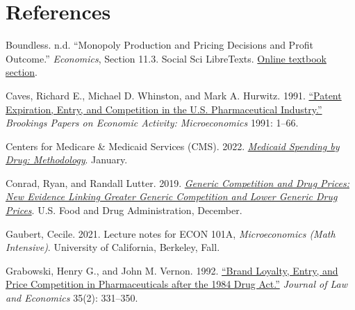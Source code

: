 \begingroup
\hypersetup{urlcolor=black}
\section*{References}
\label{sec:references}

\begin{singlespace}
\begin{list}{}{
    \setlength{\leftmargin}{1.5em}
    \setlength{\itemindent}{-1.5em}
    \setlength{\itemsep}{0.75\baselineskip}
    \setlength{\parsep}{0pt}
}

\item
Boundless. n.d.
``Monopoly Production and Pricing Decisions and Profit Outcome.''
\textit{Economics}, Section 11.3. Social Sci LibreTexts.
\href{https://socialsci.libretexts.org/Bookshelves/Economics/Introductory_Comprehensive_Economics/Economics_(Boundless)/11:_Monopoly/11.03:_Monopoly_Production_and_Pricing_Decisions_and_Profit_Outcome}{Online textbook section}.

\item
Caves, Richard E., Michael D. Whinston, and Mark A. Hurwitz. 1991.
\href{https://www.brookings.edu/wp-content/uploads/1991/01/1991_bpeamicro_caves.pdf}{``Patent Expiration, Entry, and Competition in the U.S. Pharmaceutical Industry.''}
\textit{Brookings Papers on Economic Activity: Microeconomics} 1991: 1--66.

\item
Centers for Medicare \& Medicaid Services (CMS). 2022.
\href{https://data.cms.gov/sites/default/files/2022-01/DSD_MCD_R21_20220118_Methodology_WDDSE.pdf}{\textit{Medicaid Spending by Drug: Methodology}}.
January.

\item
Conrad, Ryan, and Randall Lutter. 2019.
\href{https://www.fda.gov/media/133509/download}{\textit{Generic Competition and Drug Prices: New Evidence Linking Greater Generic Competition and Lower Generic Drug Prices}}.
U.S. Food and Drug Administration, December.

\item
Gaubert, Cecile. 2021.
Lecture notes for ECON 101A, \textit{Microeconomics (Math Intensive)}.
University of California, Berkeley, Fall.

\item
Grabowski, Henry G., and John M. Vernon. 1992.
\href{https://doi.org/10.1086/467257}{``Brand Loyalty, Entry, and Price Competition in Pharmaceuticals after the 1984 Drug Act.''}
\textit{Journal of Law and Economics} 35(2): 331--350.


\end{list}
\end{singlespace}
